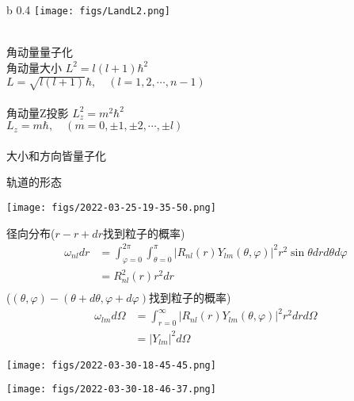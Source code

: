  
    
    \begin{wrapfigure} {b} {0.4\textwidth} %
        \texttt{[image: figs/LandL2.png]}   
    \end{wrapfigure}
	~~\\
	{角动量量子化}\\
    {\Bullet} 角动量大小  $L^2=l(l+1) \hbar^2$\\
	$L=\sqrt{l(l+1)}\hbar, \quad (l=1,2,\cdots, n-1)$\\
    ~~\\ \vspace{0.3em}
    {\Bullet} 角动量Z投影 $L^2_z=m^2\hbar^2$\\
    $L_z=m\hbar, \quad (m=0,\pm 1,\pm 2, \cdots, \pm l)$\\
	~~\\
    {\Bullet} 大小和方向皆量子化
 


	{轨道的形态}
		\begin{center}
			 \texttt{[image: figs/2022-03-25-19-35-50.png]}
		\end{center}	 
	
		{}
	\例 [求电子云的形态]{}
		
	{\Bullet} 径向分布($r-r+dr$找到粒子的概率)
			 \[ \begin{aligned}
		  \omega_{nl} dr &= \int _{\varphi=0} ^{2\pi} \int _{\theta=0} ^{\pi} |R_{nl}(r)Y_{lm}(\theta,\varphi)|^2 r^2\sin \theta dr d\theta d \varphi \\
		  &= R^2_{nl}(r) r^2 dr \\
		  \end{aligned}\]
	{\Bullet}($(\theta,\varphi)-(\theta+d\theta,\varphi+d\varphi)$找到粒子的概率)		
		  \[ \begin{aligned}
			  \omega_{lm} d \Omega &= \int _{r=0} ^{\infty} |R_{nl}(r)Y_{lm}(\theta,\varphi)|^2 r^2dr  d \Omega \\
			  &= |Y_{lm}|^2 d \Omega 	
		\end{aligned}\] 

	{}
  \begin{center}
	   \texttt{[image: figs/2022-03-30-18-45-45.png]}
  \end{center}



	{}
  \begin{center}
	   \texttt{[image: figs/2022-03-30-18-46-37.png]}
  \end{center}



